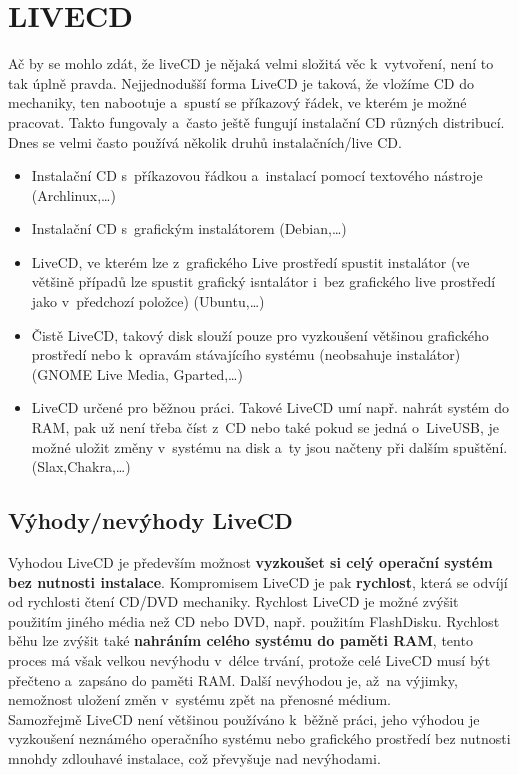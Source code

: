 \documentclass[a4paper,12pt]{article}
\newcommand{\upc}[1]{\uppercase{#1}} %
\begin{document}
\section{\upc{LiveCD}}
Ač by se mohlo zdát, že liveCD je nějaká velmi složitá věc k~vytvoření, není to tak úplně pravda. Nejjednodušší forma LiveCD je taková, že vložíme CD do mechaniky, ten nabootuje a~spustí se příkazový řádek, ve kterém je možné pracovat. Takto fungovaly a~často ještě fungují instalační CD různých distribucí. Dnes se velmi často používá několik druhů instalačních/live CD.
\begin{itemize}
 \item Instalační CD s~příkazovou řádkou a~instalací pomocí textového nástroje (Archlinux,…)
 \item Instalační CD s~grafickým instalátorem (Debian,…)
 \item LiveCD, ve kterém lze z~grafického Live prostředí spustit instalátor (ve většině případů lze spustit grafický isntalátor i~bez grafického live prostředí jako v~předchozí položce) (Ubuntu,…)
 \item Čistě LiveCD, takový disk slouží pouze pro vyzkoušení většinou grafického prostředí nebo k~opravám stávajícího systému (neobsahuje instalátor) (GNOME Live Media, Gparted,…)
 \item LiveCD určené pro běžnou práci. Takové LiveCD umí např. nahrát systém do RAM, pak už není třeba číst z~CD nebo také pokud se jedná o~LiveUSB, je možné uložit změny v~systému na disk a~ty jsou načteny při dalším spuštění. (Slax,Chakra,…)
\end{itemize}

\subsection{Výhody/nevýhody LiveCD}
Vyhodou LiveCD je především možnost \textbf{vyzkoušet si celý operační systém bez nutnosti instalace}. Kompromisem LiveCD je pak \textbf{rychlost}, která se odvíjí od rychlosti čtení CD/DVD mechaniky. Rychlost LiveCD je možné zvýšit použitím jiného média než CD nebo DVD, např. použitím FlashDisku. Rychlost běhu lze zvýšit také \textbf{nahráním celého systému do paměti RAM}, tento proces má však velkou nevýhodu v~délce trvání, protože celé LiveCD musí být přečteno a~zapsáno do paměti RAM. Další nevýhodou je, až~na výjimky, nemožnost uložení změn v~systému zpět na přenosné médium.\\

Samozřejmě LiveCD není většinou používáno k~běžně práci, jeho výhodou je vyzkoušení neznámého operačního systému nebo grafického prostředí bez nutnosti mnohdy zdlouhavé instalace, což převyšuje nad nevýhodami.
\end{document}
